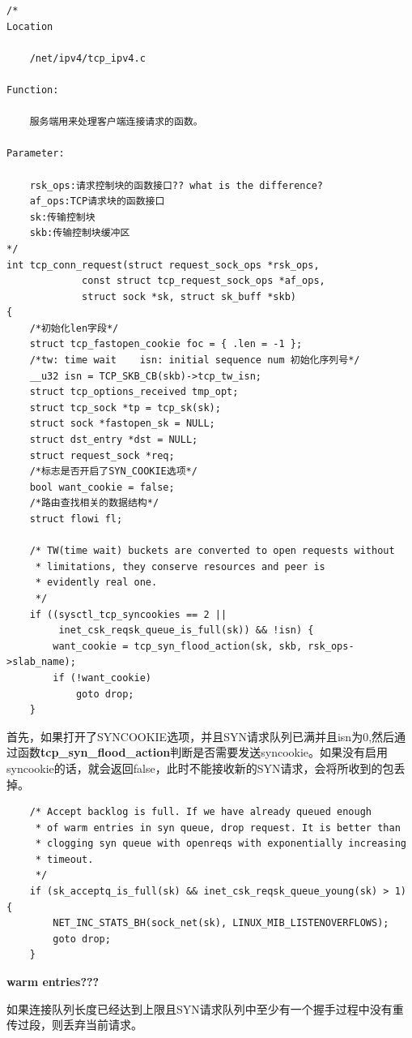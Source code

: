\begin{verbatim}
/* 
Location

	/net/ipv4/tcp_ipv4.c

Function:

	服务端用来处理客户端连接请求的函数。

Parameter:

	rsk_ops:请求控制块的函数接口?? what is the difference?
	af_ops:TCP请求块的函数接口
	sk:传输控制块
	skb:传输控制块缓冲区
*/
int tcp_conn_request(struct request_sock_ops *rsk_ops,
             const struct tcp_request_sock_ops *af_ops,
             struct sock *sk, struct sk_buff *skb)
{
	/*初始化len字段*/
    struct tcp_fastopen_cookie foc = { .len = -1 };     
    /*tw: time wait    isn: initial sequence num 初始化序列号*/
	__u32 isn = TCP_SKB_CB(skb)->tcp_tw_isn;            
    struct tcp_options_received tmp_opt;
    struct tcp_sock *tp = tcp_sk(sk);
    struct sock *fastopen_sk = NULL;
    struct dst_entry *dst = NULL;
    struct request_sock *req;
	/*标志是否开启了SYN_COOKIE选项*/
    bool want_cookie = false;
	/*路由查找相关的数据结构*/ 
    struct flowi fl;                                   

    /* TW(time wait) buckets are converted to open requests without
     * limitations, they conserve resources and peer is
     * evidently real one.
     */
    if ((sysctl_tcp_syncookies == 2 ||
         inet_csk_reqsk_queue_is_full(sk)) && !isn) {
        want_cookie = tcp_syn_flood_action(sk, skb, rsk_ops->slab_name);
        if (!want_cookie)
            goto drop;
    }
\end{verbatim}
                首先，如果打开了SYNCOOKIE选项，并且SYN请求队列已满并且isn为0,然后通过函数\textbf{tcp\_syn\_flood\_action}判断是否需要发送syncookie。如果没有启用syncookie的话，就会返回false，此时不能接收新的SYN请求，会将所收到的包丢掉。
\begin{verbatim}
    /* Accept backlog is full. If we have already queued enough
     * of warm entries in syn queue, drop request. It is better than
     * clogging syn queue with openreqs with exponentially increasing
     * timeout.
     */
    if (sk_acceptq_is_full(sk) && inet_csk_reqsk_queue_young(sk) > 1) {
        NET_INC_STATS_BH(sock_net(sk), LINUX_MIB_LISTENOVERFLOWS);
        goto drop;
    }
\end{verbatim}

        \textbf{warm entries???}               
        
        如果连接队列长度已经达到上限且SYN请求队列中至少有一个握手过程中没有重传过段，则丢弃当前请求。

